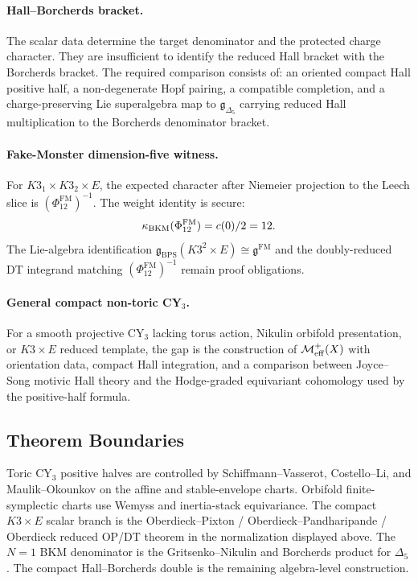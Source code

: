 \paragraph{Hall--Borcherds bracket.}
The scalar data determine the target denominator and the protected
charge character. They are insufficient to identify the reduced Hall
bracket with the Borcherds bracket. The required comparison consists of: an oriented
compact Hall positive half, a non-degenerate Hopf pairing, a compatible
completion, and a charge-preserving Lie superalgebra map to
\(\mathfrak g_{\Delta_5}\) carrying reduced Hall multiplication to the
Borcherds denominator bracket.

\paragraph{Fake-Monster dimension-five witness.}
For \(K3_1\times K3_2\times E\), the expected character after
Niemeier projection to the Leech slice is
\((\Phi_{12}^{\mathrm{FM}})^{-1}\). The weight identity is secure:
\[
  \kappa_{\mathrm{BKM}}(\Phi_{12}^{\mathrm{FM}})=c(0)/2=12.
\]
The Lie-algebra identification
\(\mathfrak g_{\mathrm{BPS}}(K3^2\times E)\cong
\mathfrak g^{\mathrm{FM}}\) and the doubly-reduced DT integrand
matching \((\Phi_{12}^{\mathrm{FM}})^{-1}\) remain proof obligations.

\paragraph{General compact non-toric CY\(_3\).}
For a smooth projective CY\(_3\) lacking torus action, Nikulin
orbifold presentation, or \(K3\times E\) reduced template, the gap is
the construction of \(\mathcal{M}^{+}_{\mathrm{eff}}(X)\) with orientation data, compact Hall
integration, and a comparison between Joyce--Song motivic Hall theory
and the Hodge-graded equivariant cohomology used by the positive-half
formula.

\subsection*{Theorem Boundaries}

Toric CY\(_3\) positive halves are controlled by
Schiffmann--Vasserot, Costello--Li, and Maulik--Okounkov on the affine
and stable-envelope charts. Orbifold finite-symplectic charts use
Wemyss and inertia-stack equivariance. The compact \(K3\times E\)
scalar branch is the Oberdieck--Pixton / Oberdieck--Pandharipande /
Oberdieck reduced OP/DT theorem in the normalization displayed above.
The \(N=1\) BKM denominator is the Gritsenko--Nikulin and Borcherds
product for \(\Delta_5\). The compact Hall--Borcherds double is the
remaining algebra-level construction.
